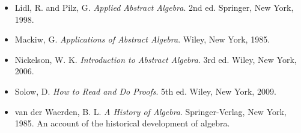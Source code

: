 {\begin{itemize}
\item[{ \bf [10]}] %
Lidl, R. and Pilz, G. 
{\it Applied Abstract Algebra}. 2nd ed. Springer,
New York, 1998. 
 
\item[{ \bf [11]}] %
Mackiw, G. {\it Applications of Abstract Algebra}. Wiley, New York,
1985. 
 
\item[{ \bf [12]}]
Nickelson, W. K. %
{\it Introduction to Abstract Algebra}. 3rd ed. Wiley, New York,
2006. 
 
 
\item[{ \bf [13]}] %
Solow, D. 
{\it How to Read and Do Proofs}. 5th ed. Wiley, New York,
2009. 
 
\item[{ \bf [14]}] %
van der Waerden, B. L. 
{\it A History of Algebra}. Springer-Verlag,
New York, 1985. An account of the historical development of algebra. 




 
 
\end{itemize}
}
 
 
 
 
 

